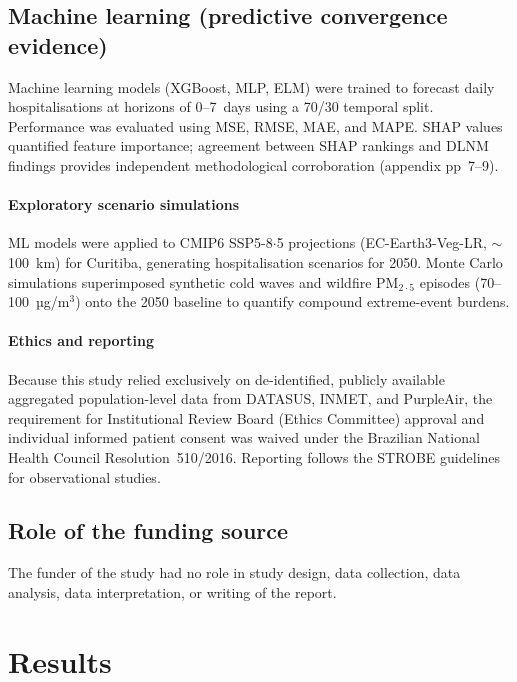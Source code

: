 \documentclass[review,number]{elsarticle}
\begin{document}
\subsection{Machine learning (predictive convergence evidence)}

Machine learning models (XGBoost,\cite{Chen2016}
MLP,\cite{Goodfellow2016} ELM\cite{Huang2006}) were trained to
forecast daily hospitalisations at horizons of 0--7~days using a
70/30 temporal split. Performance was evaluated using MSE, RMSE, MAE,
and MAPE. SHAP values\cite{Lundberg2017} quantified feature
importance; agreement between SHAP rankings and DLNM findings
provides independent methodological corroboration (appendix pp~7--9).

\paragraph{Exploratory scenario simulations}
ML models were applied to CMIP6 SSP5-8${\cdot}$5 projections
(EC-Earth3-Veg-LR, $\sim$100~km) for Curitiba, generating
hospitalisation scenarios for 2050. Monte Carlo simulations
superimposed synthetic cold waves and wildfire $\text{PM}_{2{\cdot}5}$
episodes (70--100~µg/m$^3$) onto the 2050 baseline to quantify
compound extreme-event burdens.

\paragraph{Ethics and reporting}
Because this study relied exclusively on de-identified, publicly
available aggregated population-level data from DATASUS, INMET, and
PurpleAir, the requirement for Institutional Review Board (Ethics
Committee) approval and individual informed patient consent was waived
under the Brazilian National Health Council Resolution~510/2016.
Reporting follows the STROBE guidelines for observational
studies.\cite{VonElm2007}

\subsection{Role of the funding source}
The funder of the study had no role in study design, data collection,
data analysis, data interpretation, or writing of the report.

\section{Results}
\end{document}
